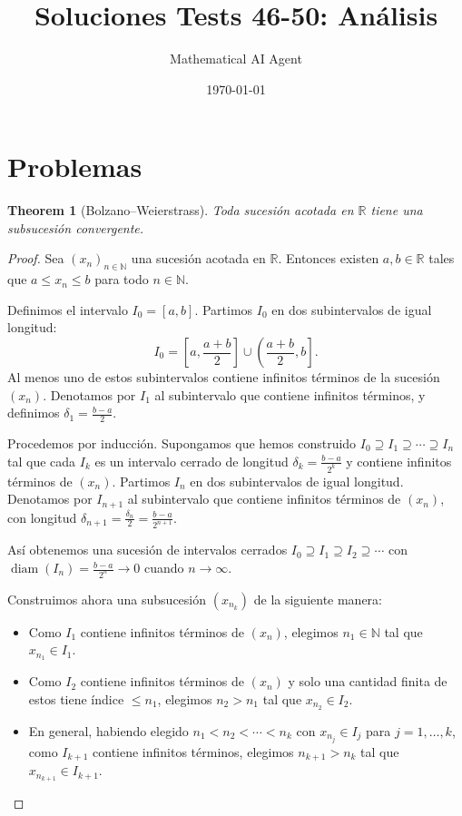 \documentclass[11pt,a4paper]{article}
\title{Soluciones Tests 46-50: Análisis}
\author{Mathematical AI Agent}
\date{\today}
\theoremstyle{plain}
\newtheorem{theorem}{Theorem}[section]
\theoremstyle{definition}
\begin{document}
\maketitle
\section{Problemas}

\begin{theorem}[Bolzano--Weierstrass]\label{thm:bolzano}
Toda sucesión acotada en $\mathbb{R}$ tiene una subsucesión convergente.
\end{theorem}

\begin{proof}
Sea $(x_n)_{n\in\mathbb{N}}$ una sucesión acotada en $\mathbb{R}$. Entonces existen $a, b \in \mathbb{R}$ tales que $a \leq x_n \leq b$ para todo $n \in \mathbb{N}$.

Definimos el intervalo $I_0 = [a, b]$. Partimos $I_0$ en dos subintervalos de igual longitud:
\[
I_0 = \left[a, \frac{a+b}{2}\right] \cup \left(\frac{a+b}{2}, b\right].
\]
Al menos uno de estos subintervalos contiene infinitos términos de la sucesión $(x_n)$. Denotamos por $I_1$ al subintervalo que contiene infinitos términos, y definimos $\delta_1 = \frac{b-a}{2}$.

Procedemos por inducción. Supongamos que hemos construido $I_0 \supseteq I_1 \supseteq \cdots \supseteq I_n$ tal que cada $I_k$ es un intervalo cerrado de longitud $\delta_k = \frac{b-a}{2^k}$ y contiene infinitos términos de $(x_n)$. Partimos $I_n$ en dos subintervalos de igual longitud. Denotamos por $I_{n+1}$ al subintervalo que contiene infinitos términos de $(x_n)$, con longitud $\delta_{n+1} = \frac{\delta_n}{2} = \frac{b-a}{2^{n+1}}$.

Así obtenemos una sucesión de intervalos cerrados $I_0 \supseteq I_1 \supseteq I_2 \supseteq \cdots$ con $\operatorname{diam}(I_n) = \frac{b-a}{2^n} \to 0$ cuando $n \to \infty$.

Construimos ahora una subsucesión $(x_{n_k})$ de la siguiente manera:
\begin{itemize}
    \item Como $I_1$ contiene infinitos términos de $(x_n)$, elegimos $n_1 \in \mathbb{N}$ tal que $x_{n_1} \in I_1$.
    \item Como $I_2$ contiene infinitos términos de $(x_n)$ y solo una cantidad finita de estos tiene índice $\leq n_1$, elegimos $n_2 > n_1$ tal que $x_{n_2} \in I_2$.
    \item En general, habiendo elegido $n_1 < n_2 < \cdots < n_k$ con $x_{n_j} \in I_j$ para $j = 1, \ldots, k$, como $I_{k+1}$ contiene infinitos términos, elegimos $n_{k+1} > n_k$ tal que $x_{n_{k+1}} \in I_{k+1}$.
\end{itemize}


\end{proof}
\end{document}

